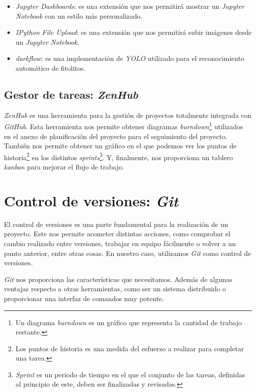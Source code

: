 \begin{itemize}
	\item \textit{Jupyter Dashboards}: es una extensión que nos permitirá mostrar un \textit{Jupyter Notebook} con un estilo más personalizado.
	\item \textit{IPython File Upload}: es una extensión que nos permitirá subir imágenes desde un \textit{Jupyter Notebook}.
	\item \textit{darkflow}: es una implementación de \textit{YOLO} utilizado para el reconocimiento automático de fitolitos.
\end{itemize}

\subsection{Gestor de tareas: \textit{ZenHub}}

\textit{ZenHub} es una herramienta para la gestión de proyectos totalmente integrada con \textit{GitHub}. Esta herramienta nos permite obtener diagramas \textit{burndown}\footnote{Un diagrama \textit{burndown} es un gráfico que representa la cantidad de trabajo restante.} utilizados en el anexo de planificación del proyecto para el seguimiento del proyecto. También nos permite obtener un gráfico en el que podemos ver los puntos de historia\footnote{Los puntos de historia es una medida del esfuerzo a realizar para completar una tarea.} en los distintos \textit{sprints}\footnote{\textit{Sprint} es un periodo de tiempo en el que el conjunto de las tareas, definidas al principio de este, deben ser finalizadas y revisadas.}. Y, finalmente, nos proporciona un tablero \textit{kanban} para mejorar el flujo de trabajo.

\section{Control de versiones: \textit{Git}}

El control de versiones es una parte fundamental para la realización de un proyecto. Este nos permite acometer distintas acciones, como comprobar el cambio realizado entre versiones, trabajar en equipo fácilmente o volver a un punto anterior, entre otras cosas. En nuestro caso, utilizamos \textit{Git} como control de versiones. 

\textit{Git} nos proporciona las características que necesitamos. Además de algunas ventajas respecto a otras herramientas, como ser un sistema distribuido o proporcionar una interfaz de comandos muy potente.

